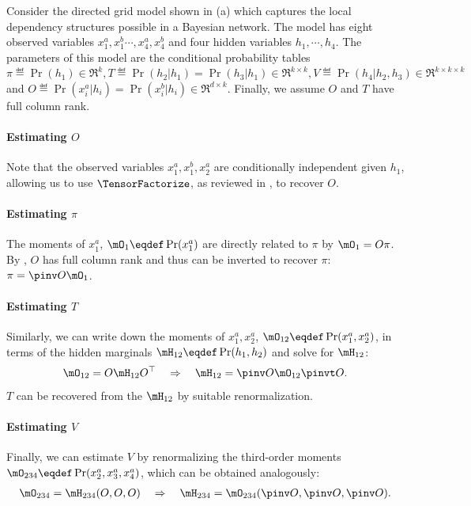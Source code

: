 Consider the directed grid model shown in (a) which
  captures the local dependency structures possible in
  a Bayesian network.
The model has eight observed variables $x^a_1, x^b_1 \cdots, x^a_4, x^b_4$ and four
  hidden variables $h_1, \cdots, h_4$.
The parameters of this model are the conditional probability tables
$\pi \eqdef \Pr(h_1) \in \Re^k, T \eqdef \Pr(h_2 | h_1) = \Pr(h_3 | h_1) \in \Re^{k \times k},
V \eqdef \Pr(h_4 | h_2, h_3) \in \Re^{k \times k \times k}$ and $O \eqdef \Pr(x^a_i | h_i)
=  \Pr(x^b_i | h_i) \in \Re^{d \times k}$. 
Finally, we assume $O$ and $T$ have full column rank.

\paragraph{Estimating $O$}
Note that the observed variables $x^a_1, x^b_1, x^a_2$ are
  conditionally independent given $h_1$, allowing us to use
  $\TensorFactorize$, as reviewed in , to recover
  $O$.

\paragraph{Estimating $\pi$}
The moments of $x^a_1$, $\mO_1 \eqdef \Pr(x^a_1)$ are directly related to
  $\pi$ by $\mO_1 = O \pi$. 
By , $O$ has full column rank and thus can be
  inverted to recover $\pi$: $\pi = \pinv O \mO_1$.

\paragraph{Estimating $T$}
Similarly, we can write down the moments of $x^a_1, x^a_2$, $\mO_{12}
  \eqdef \Pr(x^a_1, x^a_2)$, in terms of the hidden marginals $\mH_{12}
  \eqdef \Pr(h_1, h_2)$ and solve for $\mH_{12}$:
\begin{align*}
\mO_{12} = O \mH_{12} O^\top \quad\Rightarrow\quad
  \mH_{12} = \pinv O \mO_{12} \pinvt O.
\end{align*}
$T$ can be recovered from the $\mH_{12}$ by suitable renormalization.

\paragraph{Estimating $V$}
Finally, we can estimate $V$ by renormalizing the third-order moments $\mO_{234} \eqdef \Pr(x^a_2, x^a_3, x^a_4)$,
which can be obtained analogously:
\begin{align*}
  \mO_{234} = \mH_{234}(O, O, O) \quad\Rightarrow\quad
  \mH_{234} = \mO_{234}(\pinv O, \pinv O, \pinv O).
\end{align*}


